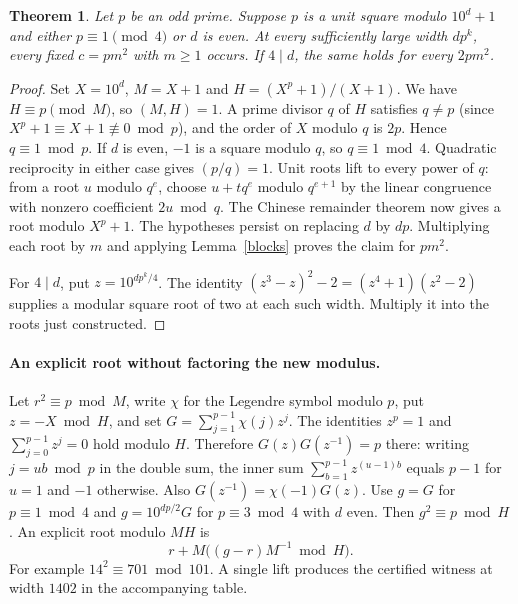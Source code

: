 \documentclass[11pt,letterpaper]{article}
\newtheorem{theorem}{Theorem}\newtheorem{lemma}[theorem]{Lemma}
\begin{document}
\begin{theorem}\label{lift}
Let $p$ be an odd prime. Suppose $p$ is a unit square modulo $10^d+1$ and either $p\equiv1\pmod4$ or $d$ is even. At every sufficiently large width $dp^k$, every fixed $c=pm^2$ with $m\ge1$ occurs. If $4\mid d$, the same holds for every $2pm^2$.
\end{theorem}
\begin{proof}
Set $X=10^d$, $M=X+1$ and $H=(X^p+1)/(X+1)$. We have $H\equiv p\pmod M$, so $(M,H)=1$. A prime divisor $q$ of $H$ satisfies $q\ne p$ (since $X^p+1\equiv X+1\not\equiv0\bmod p$), and the order of $X$ modulo $q$ is $2p$. Hence $q\equiv1\bmod p$. If $d$ is even, $-1$ is a square modulo $q$, so $q\equiv1\bmod4$. Quadratic reciprocity in either case gives $(p/q)=1$. Unit roots lift to every power of $q$: from a root $u$ modulo $q^e$, choose $u+tq^e$ modulo $q^{e+1}$ by the linear congruence with nonzero coefficient $2u\bmod q$. The Chinese remainder theorem now gives a root modulo $X^p+1$. The hypotheses persist on replacing $d$ by $dp$. Multiplying each root by $m$ and applying Lemma~\ref{blocks} proves the claim for $pm^2$.

For $4\mid d$, put $z=10^{dp^k/4}$. The identity $(z^3-z)^2-2=(z^4+1)(z^2-2)$ supplies a modular square root of two at each such width. Multiply it into the roots just constructed.
\end{proof}

\paragraph{An explicit root without factoring the new modulus.}
Let $r^2\equiv p\bmod M$, write $\chi$ for the Legendre symbol modulo $p$, put $z=-X\bmod H$, and set $G=\sum_{j=1}^{p-1}\chi(j)z^j$. The identities $z^p=1$ and $\sum_{j=0}^{p-1}z^j=0$ hold modulo $H$. Therefore $G(z)G(z^{-1})=p$ there: writing $j=ub\bmod p$ in the double sum, the inner sum $\sum_{b=1}^{p-1}z^{(u-1)b}$ equals $p-1$ for $u=1$ and $-1$ otherwise. Also $G(z^{-1})=\chi(-1)G(z)$. Use $g=G$ for $p\equiv1\bmod4$ and $g=10^{dp/2}G$ for $p\equiv3\bmod4$ with $d$ even. Then $g^2\equiv p\bmod H$. An explicit root modulo $MH$ is
\[
 r+M\big((g-r)M^{-1}\bmod H\big).
\]
For example $14^2\equiv701\bmod101$. A single lift produces the certified witness at width $1402$ in the accompanying table.
\end{document}
